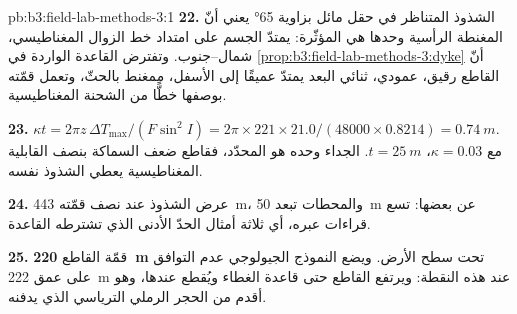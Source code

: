 \begin{solution}{pb:b3:field-lab-methods-3:1}
\textbf{22.} الشذوذ المتناظر في حقل مائل بزاوية \ang{65} يعني أنّ
المغنطة الرأسية وحدها هي المؤثّرة: يمتدّ الجسم على امتداد خط الزوال
المغناطيسي، شمال--جنوب. وتفترض القاعدة الواردة في
\cref{prop:b3:field-lab-methods-3:dyke} أنّ القاطع رقيق، عمودي،
ثنائي البعد يمتدّ عميقًا إلى الأسفل، ممغنط بالحثّ، وتعمل قمّته
بوصفها خطًّا من الشحنة المغناطيسية.

\textbf{23.} $\kappa t = 2\pi z\,\Delta T_\mathrm{max}/(F\sin^2 I) = 2\pi\times
221\times21.0/(48000\times0.8214) = \qty{0.74}{m}$. مع $\kappa =
0.03$، $t = \qty{25}{m}$. الجداء وحده هو المحدّد، فقاطع ضعف
السماكة بنصف القابلية المغناطيسية يعطي الشذوذ نفسه.

\textbf{24.} عرض الشذوذ عند نصف قمّته \qty{443}{m}، والمحطات
تبعد \qty{50}{m} عن بعضها: تسع قراءات عبره، أي ثلاثة أمثال
الحدّ الأدنى الذي تشترطه القاعدة.

\textbf{25.} قمّة القاطع
\textbf{\qty[text-series-to-math=true]{220}{m}} تحت سطح الأرض. ويضع النموذج
الجيولوجي عدم التوافق على عمق \qty{222}{m} عند هذه النقطة:
ويرتفع القاطع حتى قاعدة الغطاء ويُقطع عندها، وهو أقدم
من الحجر الرملي الترياسي الذي يدفنه.
\end{solution}
